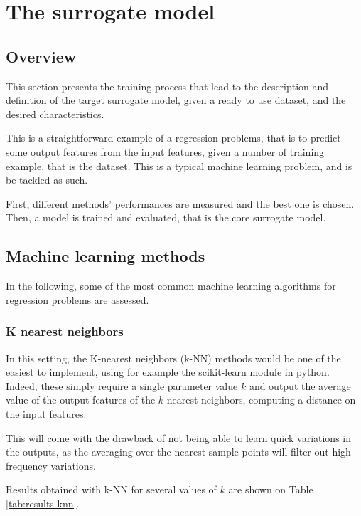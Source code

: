 \section{The surrogate model}

\subsection{Overview}

This section presents the training process that lead to the description and definition of the target surrogate model, given a ready to use dataset, and the desired characteristics.

This is a straightforward example of a regression problems, that is to predict some output features from the input features, given a number of training example, that is the dataset. This is a typical machine learning problem, and is be tackled as such.

First, different methods' performances are measured and the best one is chosen. Then, a model is trained and evaluated, that is the core surrogate model.

\subsection{Machine learning methods}

In the following, some of the most common machine learning algorithms for regression problems \cite{machine-learning-class} are assessed.

\subsubsection{K nearest neighbors}

In this setting, the K-nearest neighbors (k-NN) methods would be one of the easiest to implement, using for example the \href{https://scikit-learn.org/stable/modules/neighbors.html\#nearest-neighbors-regression}{scikit-learn} \cite{scikit-learn} module in python. Indeed, these simply require a single parameter value $k$ and output the average value of the output features of the $k$ nearest neighbors, computing a distance on the input features.

This will come with the drawback of not being able to learn quick variations in the outputs, as the averaging over the nearest sample points will filter out high frequency variations.

Results obtained with k-NN for several values of $k$ are shown on Table \ref{tab:results-knn}.

